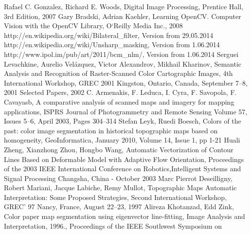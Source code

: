\documentclass[a4paper,onecolumn,oneside,12pt]{memoir}
\begin{document}
\newpage

\renewcommand\bibname{References}

\begin{thebibliography}{   }

          {Rafael C. Gonzalez, Richard E. Woods, Digital Image Processing, Prentice Hall, 3rd Edition, 2007}
          {Gary Bradski, Adrian Kaehler, Learning OpenCV. Computer Vision with the OpenCV Library,
          O`Reilly Media Inc., 2008}
          {http://en.wikipedia.org/wiki/Bilateral\_filter, Version from 29.05.2014}
          {http://en.wikipedia.org/wiki/Unsharp\_masking, Version from 1.06.2014}
          {http://www.ipol.im/pub/art/2011/bcm\_nlm/, Version from 1.06.2014}
          {Serguei Levachkine, Aurelio Velázquez, Victor Alexandrov, Mikhail Kharinov, 
          Semantic Analysis and Recognition of Raster-Scanned Color Cartographic Images,
          4th International Workshop, GREC 2001 Kingston, Ontario, Canada, September 7–8, 
          2001 Selected Papers, 2002}
          {C. Armenakis, F. Leduca, I. Cyra, F. Savopola, F. Cavayasb,
          A comparative analysis of scanned maps and imagery for mapping applications,
          ISPRS Journal of Photogrammetry and Remote Sensing Volume 57, Issues 5–6, April 2003,
          Pages 304–314}
          {Stefan Leyk, Ruedi Boesch, Colors of the past: color image segmentation in historical 
          topographic maps based on homogeneity, GeoInformatica, January 2010, Volume 14, Issue 1, pp 1-21 }
          {Huali Zheng, Xianzhong Zhou, Hongbo Wang, Automatic Vectorization of Contour Lines Based
          on Deformable Model with Adaptive Flow Orientation, Proceedings of the 2003 IEEE
          International Conference on Robotics,Intelligent Systems and Signal Processing
          Changsha, China - October 2003}
          {Marc Pierrot Deseilligny, Robert Mariani, Jacque Labiche, Remy Mullot,
          Topographic Maps Automatic Interpretation: Some Proposed Strategies, Second International
          Workshop, GREC' 97 Nancy, France, August 22–23, 1997}
          {Alireza Khotanzad, Edd Zink, Color paper map segmentation using eigenvector line-fitting,
          Image Analysis and Interpretation, 1996., Proceedings of the IEEE Southwest Symposium on
}
\end{thebibliography}
\end{document}
